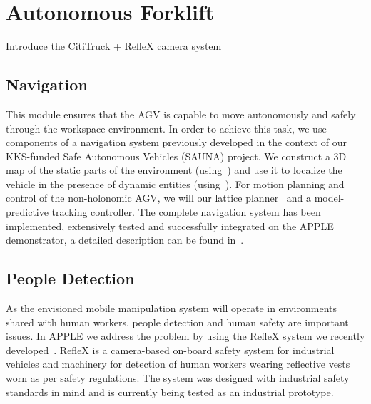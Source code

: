 \section{Autonomous Forklift}
\label{sec:agv}
%
Introduce the CitiTruck + RefleX camera system
%
\subsection{Navigation}
\label{subsec:navigation}
%
This module ensures that the AGV is capable to move autonomously and safely through the workspace
environment. In order to achieve this task, we use components of a navigation system previously
developed in the context of our KKS-funded Safe Autonomous Vehicles (SAUNA) project. We construct a
3D map of the static parts of the environment (using~\cite{Stoy13}) and use it to localize the
vehicle in the presence of dynamic entities (using~\cite{Vale14}). For motion planning and control
of the non-holonomic AGV, we will our lattice planner~\cite{Ciri14} and a model-predictive tracking
controller. The complete navigation system has been implemented, extensively tested and successfully
integrated on the APPLE demonstrator, a detailed description can be found in~\cite{Andr15}.
%
\subsection{People Detection}
\label{subsec:people_det}
%
As the envisioned mobile manipulation system will operate in environments shared with human workers,
people detection and human safety are important issues. In APPLE we address the problem by using the
RefleX system we recently developed~\cite{Mosb14}. RefleX is a camera-based on-board safety system
for industrial vehicles and machinery for detection of human workers wearing reflective vests worn
as per safety regulations. The system was designed with industrial safety standards in mind and is
currently being tested as an industrial prototype.
%
